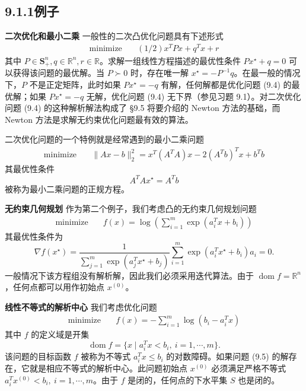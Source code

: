 \documentclass[UTF8, 12pt, fontset=fandol, oneside]{ctexart}
\begin{document}
\subsection*{9.1.1\quad 例子}

\noindent\textbf{二次优化和最小二乘}\quad
一般性的二次凸优化问题具有下述形式
\begin{equation}
\begin{aligned}
\text{minimize}\quad & (1/2)x^TPx+q^Tx+r
\end{aligned}
\tag{9.4}
\end{equation}
其中 $P\in\mathbf{S}_+^n,q\in\mathbb{R}^n,r\in\mathbb{R}$。求解一组线性方程描述的最优性条件 $Px^\star+q=0$ 可以获得该问题的最优解。当 $P\succ0$ 时，存在唯一解 $x^\star=-P^{-1}q$。在最一般的情况下，$P$ 不是正定矩阵，此时如果 $Px^\star=-q$ 有解，任何解都是优化问题 (9.4) 的最优解；如果 $Px^\star=-q$ 无解，优化问题 (9.4) 无下界（参见习题 9.1）。对二次优化问题 (9.4) 的这种解析解法构成了 \S9.5 将要介绍的 Newton 方法的基础，而 Newton 方法是求解无约束优化问题最有效的算法。

二次优化问题的一个特例就是经常遇到的最小二乘问题
\[
\begin{aligned}
\text{minimize}\quad & \|Ax-b\|_2^2=x^T(A^TA)x-2(A^Tb)^Tx+b^Tb
\end{aligned}
\]
其最优性条件
\[
A^TAx^\star=A^Tb
\]
被称为最小二乘问题的正规方程。

\noindent\textbf{无约束几何规划}\quad
作为第二个例子，我们考虑凸的无约束几何规划问题
\[
\begin{aligned}
\text{minimize}\quad & f(x)=\log\left(\sum_{i=1}^m \exp(a_i^Tx+b_i)\right)
\end{aligned}
\]
其最优性条件为
\[
\nabla f(x^\star)=
\frac{1}{\sum_{j=1}^m\exp(a_j^Tx^\star+b_j)}
\sum_{i=1}^m \exp(a_i^Tx^\star+b_i)a_i=0.
\]
一般情况下该方程组没有解析解，因此我们必须采用迭代算法。由于 $\operatorname{dom} f=\mathbb{R}^n$，任何点都可以用作初始点 $x^{(0)}$。

\noindent\textbf{线性不等式的解析中心}\quad
我们考虑优化问题
\begin{equation}
\begin{aligned}
\text{minimize}\quad & f(x)=-\sum_{i=1}^m\log(b_i-a_i^Tx)
\end{aligned}
\tag{9.5}
\end{equation}
其中 $f$ 的定义域是开集
\[
\operatorname{dom} f=\{x\mid a_i^Tx<b_i,\ i=1,\cdots,m\}.
\]
该问题的目标函数 $f$ 被称为不等式 $a_i^Tx\leq b_i$ 的对数障碍。如果问题 (9.5) 的解存在，它就是相应不等式的解析中心。此问题初始点 $x^{(0)}$ 必须满足严格不等式 $a_i^Tx^{(0)}<b_i,\ i=1,\cdots,m$。由于 $f$ 是闭的，任何点的下水平集 $S$ 也是闭的。
\end{document}
